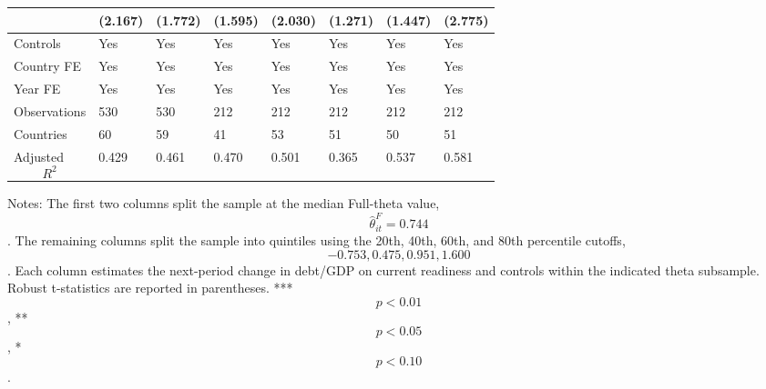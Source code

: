 \begin{table}[H]
\begin{threeparttable}
\begin{tabularx}{\textwidth}{lYYYYYYY}
  & (2.167) & (1.772) & (1.595) & (2.030) & (1.271) & (1.447) & (2.775) \\
\midrule
Controls & Yes & Yes & Yes & Yes & Yes & Yes & Yes \\
Country FE & Yes & Yes & Yes & Yes & Yes & Yes & Yes \\
Year FE & Yes & Yes & Yes & Yes & Yes & Yes & Yes \\
Observations & 530 & 530 & 212 & 212 & 212 & 212 & 212 \\
Countries & 60 & 59 & 41 & 53 & 51 & 50 & 51 \\
Adjusted $$R^2$$ & 0.429 & 0.461 & 0.470 & 0.501 & 0.365 & 0.537 & 0.581 \\
\bottomrule
\end{tabularx}
\begin{tablenotes}[flushleft]\footnotesize
\item Notes: The first two columns split the sample at the median Full-theta value, $$\widehat{\theta}^{F}_{it}=0.744$$. The remaining columns split the sample into quintiles using the 20th, 40th, 60th, and 80th percentile cutoffs, $$-0.753, 0.475, 0.951, 1.600$$. Each column estimates the next-period change in debt/GDP on current readiness and controls within the indicated theta subsample. Robust t-statistics are reported in parentheses. *** $$p<0.01$$, ** $$p<0.05$$, * $$p<0.10$$.
\end{tablenotes}
\end{threeparttable}
\end{table}
